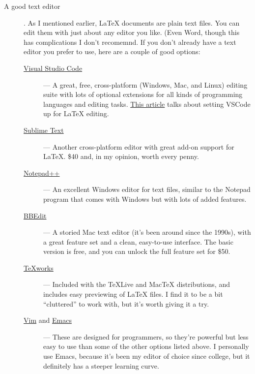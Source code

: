 \begin{description}

\item [A good text editor]. As I mentioned earlier, \LaTeX{} documents are plain
  text files. You can edit them with just about any editor you like. (Even
  Word, though this has complications I don't recomemnd. If you don't already
  have a text editor you prefer to use, here are a couple of good options:

  \begin{description}
    \item [\href{https://code.visualstudio.com}{Visual Studio Code}] --- A
      great, free, cross-platform (Windows, Mac, and Linux) editing suite with lots
      of optional extensions for all kinds of programming languages and
      editing
      tasks. \href{https://pwsmith.github.io/2020/06/05/setting-up-a-text-editor-for-latex-vscode/}{This
        article} talks about setting VSCode up for \LaTeX{} editing.
    \item [\href{https://www.sublimetext.com}{Sublime Text}] --- Another
      cross-platform editor with great add-on support for \LaTeX. \$40 and, in
      my opinion, worth every penny.
    \item [\href{https://notepad-plus-plus.org}{Notepad++}] --- An excellent
      Windows editor for text files, similar to the Notepad program that comes
      with Windows but with lots of added features.
    \item [\href{https://www.barebones.com/products/bbedit/}{BBEdit}] --- A
      storied Mac text editor (it's been around since the 1990s), with a great
      feature set and a clean, easy-to-use interface. The basic version is
      free, and you can unlock the full feature set for \$50.
    \item [\href{http://www.tug.org/texworks/}{TeXworks}] --- Included with
      the TeXLive and MacTeX distributions, and includes easy previewing of
      \LaTeX{} files. I find it to be a bit ``cluttered'' to work with, but it's
      worth giving it a try.
    \item [\href{https://www.vim.org}{Vim} and
      \href{https://www.gnu.org/software/emacs/}{Emacs}] --- These are
      designed for programmers, so they're powerful but less easy to use than
      some of the other options listed above. I personally use Emacs, because
      it's been my editor of choice since college, but it definitely has a
      steeper learning curve.
  \end{description}


\end{description}
